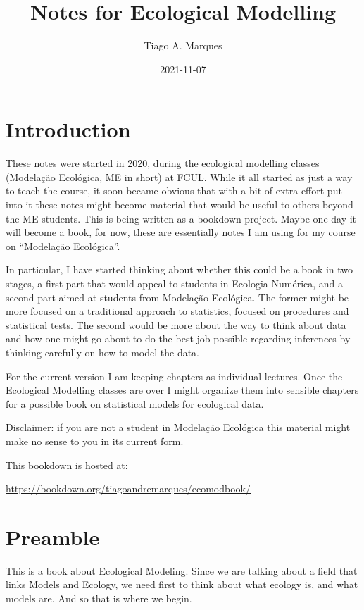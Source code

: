 \documentclass[
]{book}
\title{Notes for Ecological Modelling}
\author{Tiago A. Marques}
\date{2021-11-07}
\begin{document}
\maketitle

{
\setcounter{tocdepth}{1}
\tableofcontents
}
\hypertarget{introduction}{%
\chapter{Introduction}\label{introduction}}

These notes were started in 2020, during the ecological modelling classes (Modelação Ecológica, ME in short) at FCUL. While it all started as just a way to teach the course, it soon became obvious that with a bit of extra effort put into it these notes might become material that would be useful to others beyond the ME students. This is being written as a bookdown project. Maybe one day it will become a book, for now, these are essentially notes I am using for my course on ``Modelação Ecológica''.

In particular, I have started thinking about whether this could be a book in two stages, a first part that would appeal to students in Ecologia Numérica, and a second part aimed at students from Modelação Ecológica. The former might be more focused on a traditional approach to statistics, focused on procedures and statistical tests. The second would be more about the way to think about data and how one might go about to do the best job possible regarding inferences by thinking carefully on how to model the data.

For the current version I am keeping chapters as individual lectures. Once the Ecological Modelling classes are over I might organize them into sensible chapters for a possible book on statistical models for ecological data.

Disclaimer: if you are not a student in Modelação Ecológica this material might make no sense to you in its current form.

This bookdown is hosted at:

\url{https://bookdown.org/tiagoandremarques/ecomodbook/}

\hypertarget{mainintro}{%
\chapter{Preamble}\label{mainintro}}

This is a book about Ecological Modeling. Since we are talking about a field that links Models and Ecology, we need first to think about what ecology is, and what models are. And so that is where we begin.
\end{document}

